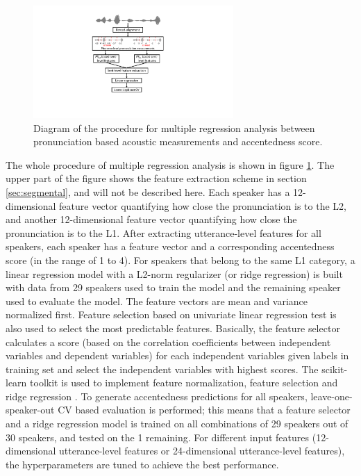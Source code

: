 \begin{figure}[t]
        \begin{minipage}[t]{1\linewidth}
        \centering
            \includegraphics[width=3.0in]{figures/L1_seg_diagram.pdf}
        \end{minipage}%
        \caption{Diagram of the procedure for multiple regression analysis between pronunciation based acoustic measurements and accentedness score.}
        \centering
        \label{fig:l1_seg_diagram}
     \end{figure}

The whole procedure of multiple regression analysis is shown in figure \ref{fig:l1_seg_diagram}. The upper part of the figure shows the feature extraction scheme in section \ref{sec:segmental}, and will not be described here. Each speaker has a 12-dimensional feature vector quantifying how close the pronunciation is to the L2, and another 12-dimensional feature vector quantifying how close the pronunciation is to the L1. After extracting utterance-level features for all speakers, each speaker has a feature vector and a corresponding accentedness score (in the range of 1 to 4). For speakers that belong to the same L1 category, a linear regression model with a L2-norm regularizer (or ridge regression) is built with data from 29 speakers used to train the model and the remaining speaker used to evaluate the model. The feature vectors are mean and variance normalized first. Feature selection based on univariate linear regression test \citep{saeys2007review} is also used to select the most predictable features. Basically, the feature selector calculates a score (based on the correlation coefficients between independent variables and dependent variables) for each independent variables given labels in training set and select the independent variables with highest scores. The scikit-learn toolkit is used to implement feature normalization, feature selection and ridge regression \citep{scikit-learn}. To generate accentedness predictions for all speakers, leave-one-speaker-out CV based evaluation is performed; this means that a feature selector and a ridge regression model is trained on all combinations of 29 speakers out of 30 speakers, and tested on the 1 remaining. For different input features (12-dimensional utterance-level features or 24-dimensional utterance-level features), the hyperparameters are tuned to achieve the best performance.

